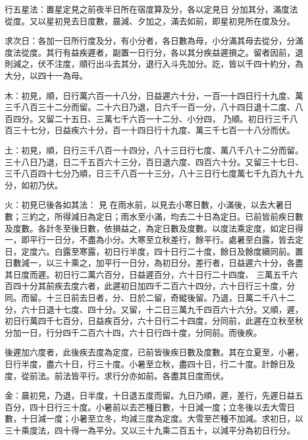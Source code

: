 \begin{pinyinscope}
 行五星法：置星定見之前夜半日所在宿度算及分，各以定見日
 分加其分，滿度法從度。又以星初見去日度數，晨減、夕加之，滿去如前，即星初見所在度及分。



 求次日：各加一日所行度及分，有小分者，各日數為母，小分滿其母去從分，分滿度法從度。其行有益疾遲者，副置一日行分，各以其分疾益遲損之。留者因前，退則減之，伏不注度，順行出斗去其分，退行入斗先加分。訖，皆以千四十約分，為大分，以四十一為母。



 木：初見，順，日行萬六百一十八分，日益遲六十分，一百一十四日行十九度、萬三千八百三十二分而留。二十六日乃退，日六千一百一分，八十四日退十二度、八百四分。又留二十五日、三萬七千六百一十二分、小分四，
 乃順。初日行三千八百三十七分，日益疾六十分，百一十四日行十九度、萬三千七百一十八分而伏。



 土：初見，順，日行三千八百一十四分，八十三日行七度、萬八千八十二分而留。三十八日乃退，日二千五百六十三分，百日退六度、四百六十分。又留三十七日、三千八百四十七分乃順，日三千八百一十三分，八十三日行七度萬七千九百九十九分，如初乃伏。



 火：初見已後各如其法：
 見
 在雨水前，以見去小寒日數，小滿後，以去大暑日數；三約之，所得減日為定日；雨水至小滿，均去二十日為定日。已前皆前疾日數及度數。各計冬至後日數，依損益之，為定日數及度數。以度法乘定度，如定日得一，即平行一日分，不盡為小分。大寒至立秋差行，餘平行。處暑至白露，皆去定日，定度六。白露至寒露，初日行半度，四十日行二十度，餘日及餘度續同前。置日數減一，以三十乘之，加平行一日分，為初日分。差行者，日益遲六十分，各盡其日度而遲。初日行二萬六百分，日益遲百分，六十日行二十四度、
 三萬五千六百四十分其前疾去度六者，此遲初日加四千二百六十四分，六十日行三十度，分同。而留。十三日前去日者，分、日於二留，奇縱後留。乃退，日萬二千八十二分，六十日退十七度、四十分。又留，十二日三萬九千四百六十六分。又順，遲，初日行萬四千七百分，日益疾百分，六十日行二十四度，分同前，此遲在立秋至秋分加一日，行分四千二百六十四，六十日行四十度，分同前。而後疾。



 後遲加六度者，此後疾去度為定度，已前皆後疾日數及度數。其在立夏至，小暑，日行半度，盡六十日，行三十度。小暑至立秋，盡四十日，行二十度。計餘日及度，從前法。前法皆平行。求行分亦如前。各盡其日度而伏。



 金：晨初見，乃退，日半度，十日退五度而留。九日乃順，遲，差行，先遲日益五百分，四十日行三十度。小暑前以去芒種日數，十日減一度；立冬後以去大雪日數，十日減一度；小暑至立冬，均減三度為定度。大雪至芒種不加減。求初日，以三十乘度法，四十得一為平分。又以三十九乘二百五十，以減平分為初日行分。




\end{pinyinscope}
